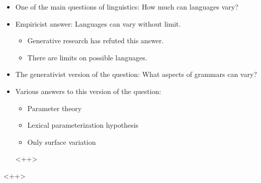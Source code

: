 \documentclass[letterpaper,12pt]{article}
\begin{document}
\begin{itemize}
	\item One of the main questions of linguistics: How much can languages vary?
	\item Empiricist answer: Languages can vary without limit.
		\begin{itemize}
			\item Generative research has refuted this answer.
			\item There are limits on possible languages.
		\end{itemize}
	\item The generativist version of the question: What aspects of grammars can vary?
	\item Various answers to this version of the question:
		\begin{itemize}
			\item Parameter theory
			\item Lexical parameterization hypothesis
			\item Only surface variation
		\end{itemize}<++>
\end{itemize}<++>
\end{document}
